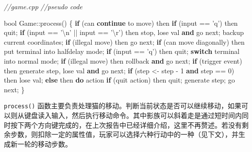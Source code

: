 \documentclass[hyperref,UTF8,a4paper]{ctexart}
\newenvironment{Shaded}{}{}
\newcommand{\CharTok}[1]{\textcolor[rgb]{0.25,0.44,0.63}{#1}}
\newcommand{\CommentTok}[1]{\textcolor[rgb]{0.38,0.63,0.69}{\textit{#1}}}
\newcommand{\ControlFlowTok}[1]{\textcolor[rgb]{0.00,0.44,0.13}{\textbf{#1}}}
\newcommand{\DataTypeTok}[1]{\textcolor[rgb]{0.56,0.13,0.00}{#1}}
\newcommand{\DecValTok}[1]{\textcolor[rgb]{0.25,0.63,0.44}{#1}}
\newcommand{\KeywordTok}[1]{\textcolor[rgb]{0.00,0.44,0.13}{\textbf{#1}}}
\newcommand{\NormalTok}[1]{#1}
\newcommand{\SpecialCharTok}[1]{\textcolor[rgb]{0.25,0.44,0.63}{#1}}
\begin{document}
\begin{Shaded}
\begin{Highlighting}[]
\CommentTok{//game.cpp}
\CommentTok{//pseudo code}

\DataTypeTok{bool}\NormalTok{ Game::process()}
\NormalTok{\{}
    \ControlFlowTok{if}\NormalTok{ (can }\ControlFlowTok{continue}\NormalTok{ to move) then}
        \ControlFlowTok{if}\NormalTok{ (input == }\CharTok{'q'}\NormalTok{) then}
\NormalTok{            quit;}
        \ControlFlowTok{if}\NormalTok{ (input == }\CharTok{'}\SpecialCharTok{\textbackslash{}n}\CharTok{'}\NormalTok{ || input == }\CharTok{'}\SpecialCharTok{\textbackslash{}r}\CharTok{'}\NormalTok{) then}
\NormalTok{            stop, lose val }\KeywordTok{and}\NormalTok{ go next;}
\NormalTok{        backup current coordinates;}
        \ControlFlowTok{if}\NormalTok{ (illegal move) then}
\NormalTok{            go next;}
        \ControlFlowTok{if}\NormalTok{ (can move diagonally) then}
\NormalTok{            put terminal into halfdelay mode;}
            \ControlFlowTok{if}\NormalTok{ (input == }\CharTok{'q'}\NormalTok{) then}
\NormalTok{                quit;}
            \ControlFlowTok{switch}\NormalTok{ terminal into normal mode;}
            \ControlFlowTok{if}\NormalTok{ (illegal move) then}
\NormalTok{                rollback }\KeywordTok{and}\NormalTok{ go next;}
        \ControlFlowTok{if}\NormalTok{ (trigger event) then}
\NormalTok{            generate step, lose val }\KeywordTok{and}\NormalTok{ go next;}
        \ControlFlowTok{if}\NormalTok{ (step <- step - }\DecValTok{1} \KeywordTok{and}\NormalTok{ step == }\DecValTok{0}\NormalTok{) then}
\NormalTok{            lose val;}
    \ControlFlowTok{else}\NormalTok{ then}
        \ControlFlowTok{do}\NormalTok{ action}
        \ControlFlowTok{if}\NormalTok{ (quit action) then}
\NormalTok{            quit;}
\NormalTok{        generate step;}
\NormalTok{    go next;}
\NormalTok{\}}
\end{Highlighting}
\end{Shaded}

\texttt{process()}
函数主要负责处理猫的移动。判断当前状态是否可以继续移动，如果可以则从键盘读入输入，然后执行移动命令。其中影族可以斜着走是通过短时间内同时按下两个方向键完成的，在上次报告中已经详细介绍，这里不再赘述。若没有剩余步数，则扣除一定的属性值，玩家可以选择六种行动中的一种（见下文），并生成新一轮的移动步数。
\end{document}
